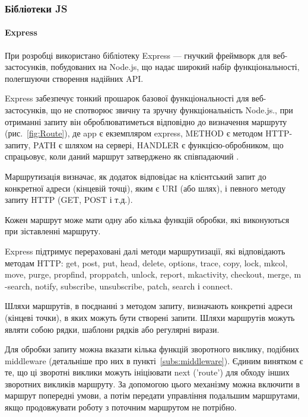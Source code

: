 \subsubsection{Бібліотеки JS}

\paragraph{Express}

При розробці використано бібліотеку Express — гнучкий фреймворк для веб-застосунків, побудованих на Node.js, що надає широкий набір функціональності, полегшуючи створення надійних API.

Express забезпечує тонкий прошарок базової функціональності для веб-застосунків, що не спотворює звичну та зручну функціональність Node.js., при отриманні запиту він оброблюватиметься відповідно до визначення маршруту (рис.~\ref{fig:Route}), де app є екземпляром express, METHOD є методом HTTP-запиту, PATH є шляхом на сервері, HANDLER є функцією-обробником, що спрацьовує, коли даний маршрут затверджено як співпадаючий \cite{hahn2016express}.

Маршрутизація визначає, як додаток відповідає на клієнтський запит до конкретної адреси (кінцевій точці), яким є URI (або шлях), і певного методу запиту HTTP (GET, POST і т.д.).

Кожен маршрут може мати одну або кілька функцій обробки, які виконуються при зіставленні маршруту.

Express підтримує перераховані далі методи маршрутизації, які відповідають методам HTTP: get, post, put, head, delete, options, trace, copy, lock, mkcol, move, purge, propfind, proppatch, unlock, report, mkactivity, checkout, merge, m -search, notify, subscribe, unsubscribe, patch, search і connect.

Шляхи маршрутів, в поєднанні з методом запиту, визначають конкретні адреси (кінцеві точки), в яких можуть бути створені запити. Шляхи маршрутів можуть являти собою рядки, шаблони рядків або регулярні вирази.

Для обробки запиту можна вказати кілька функцій зворотного виклику, подібних middleware (детальніше про них в пункті~\ref{subs:middleware}). Єдиним винятком є те, що ці зворотні виклики можуть ініціювати next ('route') для обходу інших зворотних викликів маршруту. За допомогою цього механізму можна включити в маршрут попередні умови, а потім передати управління подальшим маршрутами, якщо продовжувати роботу з поточним маршрутом не потрібно.

